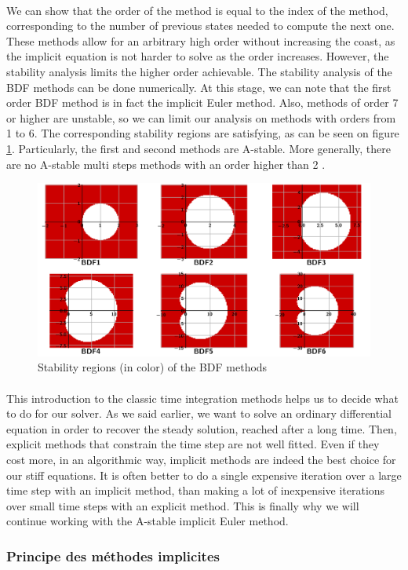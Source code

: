         \paragraph{}
        We can show that the order of the method is equal to the index of the method, corresponding to the number of previous states needed to compute the next one.
        These methods allow for an arbitrary high order without increasing the coast, as the implicit equation is not harder to solve as the order increases.
        However, the stability analysis limits the higher order achievable.
        The stability analysis of the BDF methods can be done numerically.
        At this stage, we can note that the first order BDF method is in fact the implicit Euler method.
        Also, methods of order 7 or higher are unstable, so we can limit our analysis on methods with orders from 1 to 6.
        The corresponding stability regions are satisfying, as can be seen on figure \ref{fig:bdf_stab}.
        Particularly, the first and second methods are A-stable.
        More generally, there are no A-stable multi steps methods with an order higher than 2 \cite{Dahlquist1963, HairerWanner1996}.

        \begin{figure}
          \centering
          \includegraphics[width=\textwidth]{figures/bdf_stab.png}
          \caption{Stability regions (in color) of the BDF methods}
          \label{fig:bdf_stab}
        \end{figure}

      \paragraph{}
      This introduction to the classic time integration methods helps us to decide what to do for our solver.
      As we said earlier, we want to solve an ordinary differential equation in order to recover the steady solution, reached after a long time.
      Then, explicit methods that constrain the time step are not well fitted.
      Even if they cost more, in an algorithmic way, implicit methods are indeed the best choice for our stiff equations.
      It is often better to do a single expensive iteration over a large time step with an implicit method, than making a lot of inexpensive iterations over small time steps with an explicit method.
      This is finally why we will continue working with the A-stable implicit Euler method.



      \subsubsection{Principe des méthodes implicites}
